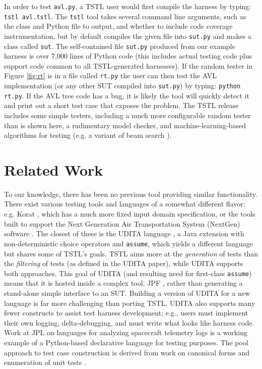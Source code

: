 \documentclass{sig-alternate}
\begin{document}
In order to test {\tt avl.py}, a TSTL user would first compile the
harness by typing: {\tt tstl avl.tstl}.  The {\tt tstl} tool takes
several command line arguments, such as the class and Python file to
output, and whether to include code coverage instrumentation, but by
default compiles the given file into {\tt sut.py} and makes a class
called {\tt sut}.  The self-contained file {\tt sut.py} produced from
our example harness is over 7,000 lines of Python code (this includes
actual testing code plus support code common to all TSTL-generated
harnesses).  If the random tester in Figure \ref{fig:rt} is in a file
called {\tt rt.py} the user can then test the AVL implementation (or
any other SUT compiled into {\tt sut.py}) by typing: {\tt python
  rt.py}.  If the AVL tree code has a bug, it is likely the tool will
quickly detect it and print out a short test case that exposes the
problem.  The TSTL release includes some simple testers, including a
much more configurable random tester than is shown here, a rudimentary
model checker, and machine-learning-based algorithms for
testing (e.g. a variant of beam search \cite{NFM15}).

\section{Related Work}


To our knowledge, there has been no previous tool providing similar
functionality.  
There exist various testing tools and languages of a somewhat
different flavor: e.g. Korat \cite{Korat}, which has a much more fixed
input domain specification, or the tools built to support the Next
Generation Air Transportation System (NextGen) software
\cite{TameInputs}.  The closest of these is the UDITA language
\cite{UDITA}, a Java extension with non-deterministic choice
operators and {\tt assume}, which yields a different language but
shares some of TSTL's goals.  TSTL aims more at the \emph{generation} of
tests than the \emph{filtering} of tests (as defined in the UDITA
paper), while UDITA supports both approaches.  This goal of UDITA (and
resulting need for first-class {\tt assume}) means that it is hosted
inside a complex tool, JPF
\cite{JPF2}, rather than generating a stand-alone simple interface to
an SUT.  Building a version of UDITA for a new language is
far more challenging than porting TSTL.  UDITA also supports many fewer
constructs to assist test harness development; e.g., users must
implement their own logging, delta-debugging, and must write what
looks like harness code.
Work at JPL on languages for analyzing spacecraft telemetry
logs \cite{scriptstospecs} is a working example of a
Python-based declarative language for testing purposes.  The pool
approach to test case construction is derived from work on canonical
forms and enumeration of unit tests \cite{AndrewsTR}.
\end{document}
